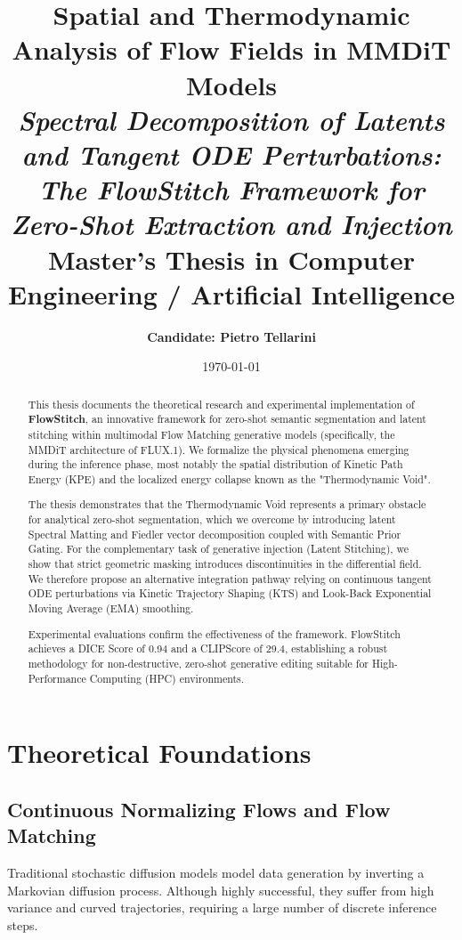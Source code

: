 \documentclass[12pt,a4paper]{report}
\title{
  \Huge\textbf{Spatial and Thermodynamic Analysis of Flow Fields in MMDiT Models}\\
  \vspace{0.8cm}
  \large\textit{Spectral Decomposition of Latents and Tangent ODE Perturbations: The FlowStitch Framework for Zero-Shot Extraction and Injection}\\
  \vspace{1.5cm}
  \normalsize Master's Thesis in Computer Engineering / Artificial Intelligence
}
\author{\textbf{Candidate: Pietro Tellarini}}
\date{\today}
\begin{document}
\maketitle

\begin{abstract}
This thesis documents the theoretical research and experimental implementation of \textbf{FlowStitch}, an innovative framework for zero-shot semantic segmentation and latent stitching within multimodal Flow Matching generative models (specifically, the MMDiT architecture of FLUX.1). We formalize the physical phenomena emerging during the inference phase, most notably the spatial distribution of Kinetic Path Energy (KPE) and the localized energy collapse known as the "Thermodynamic Void". 

The thesis demonstrates that the Thermodynamic Void represents a primary obstacle for analytical zero-shot segmentation, which we overcome by introducing latent Spectral Matting and Fiedler vector decomposition coupled with Semantic Prior Gating. For the complementary task of generative injection (Latent Stitching), we show that strict geometric masking introduces discontinuities in the differential field. We therefore propose an alternative integration pathway relying on continuous tangent ODE perturbations via Kinetic Trajectory Shaping (KTS) and Look-Back Exponential Moving Average (EMA) smoothing.

Experimental evaluations confirm the effectiveness of the framework. FlowStitch achieves a DICE Score of 0.94 and a CLIPScore of 29.4, establishing a robust methodology for non-destructive, zero-shot generative editing suitable for High-Performance Computing (HPC) environments.
\end{abstract}

\tableofcontents
\newpage

\chapter{Theoretical Foundations}

\section{Continuous Normalizing Flows and Flow Matching}
Traditional stochastic diffusion models model data generation by inverting a Markovian diffusion process. Although highly successful, they suffer from high variance and curved trajectories, requiring a large number of discrete inference steps. 
\end{document}
